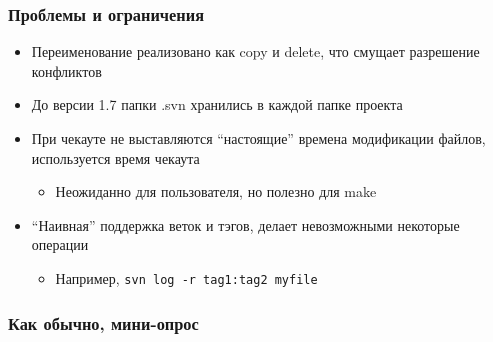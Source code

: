 \documentclass[xetex,mathserif,serif]{beamer}
\newcommand{\attribution}[1] {
	\vspace{-5mm}\begin{flushright}\begin{scriptsize}\textcolor{gray}{\textcopyright\, #1}\end{scriptsize}\end{flushright}
}
\begin{document}
	\begin{frame}[fragile]
		\frametitle{Проблемы и ограничения}
		\begin{itemize}
			\item Переименование реализовано как copy и delete, что смущает разрешение конфликтов
			\item До версии 1.7 папки .svn хранились в каждой папке проекта
			\item При чекауте не выставляются ``настоящие'' времена модификации файлов, используется время чекаута
			\begin{itemize}
				\item Неожиданно для пользователя, но полезно для make
			\end{itemize}
			\item ``Наивная'' поддержка веток и тэгов, делает невозможными некоторые операции
			\begin{itemize}
				\item Например, \verb|svn log -r tag1:tag2 myfile|
			\end{itemize}
		\end{itemize}
	\end{frame}

	\begin{frame}
		\frametitle{Как обычно, мини-опрос}
	\end{frame}


\end{document}
